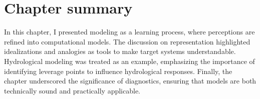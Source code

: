 \documentclass[./main_en.tex]{subfiles}
\begin{document}
\clearpage

\section{Chapter summary} \label{sec:sys:summary}

\par In this chapter, I presented modeling as a learning process, where perceptions are refined into computational models. The discussion on representation highlighted idealizations and analogies as tools to make target systems understandable. Hydrological modeling was treated as an example, emphasizing the importance of identifying leverage points to influence hydrological responses. Finally, the chapter underscored the significance of diagnostics, ensuring that models are both technically sound and practically applicable.
\end{document}
